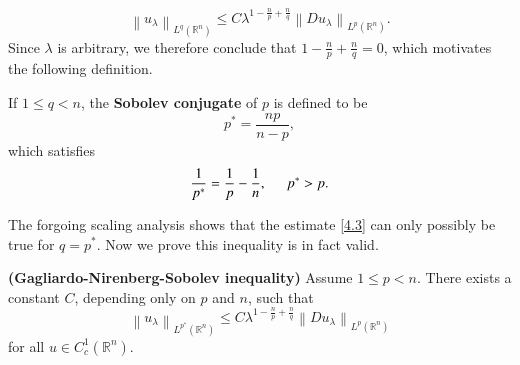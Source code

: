 $$
\left\| u_{\lambda} \right\| _{L^q\left( \mathbb{R} ^n \right)}\le C\lambda ^{1-\frac{n}{p}+\frac{n}{q}}\left\| Du_{\lambda} \right\| _{L^p\left( \mathbb{R} ^n \right)}.
$$
Since $\lambda$ is arbitrary, we therefore conclude that $1-\frac{n}{p}+\frac{n}{q}=0$, which motivates the following definition.
\begin{definition}
If $1\le q<n$, the \textbf{Sobolev conjugate} of $p$ is defined to be 
$$
p^*=\frac{np}{n-p},
$$
which satisfies 
$$
\frac{1}{p^*}=\frac{1}{p}-\frac{1}{n},\hspace{0.5cm}p^*>p.
$$
\end{definition}
The forgoing scaling analysis shows that the estimate \eqref{4.3} can only possibly be true for $q=p^*$. Now we prove this inequality is in fact valid.
\begin{theorem}{\textbf{(Gagliardo-Nirenberg-Sobolev inequality)}}\label{Thm4.6.2}
Assume $1\le p<n$. There exists a constant $C$, depending only on $p$ and $n$, such that 
$$
\left\| u_{\lambda} \right\| _{L^{p^*}\left( \mathbb{R} ^n \right)}\le C\lambda ^{1-\frac{n}{p}+\frac{n}{q}}\left\| Du_{\lambda} \right\| _{L^p\left( \mathbb{R} ^n \right)}
$$
for all $u\in C_c^1(\mathbb{R}^n)$.
\end{theorem}
